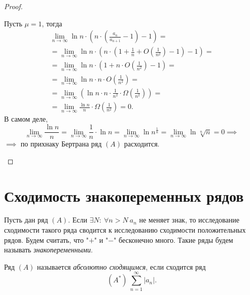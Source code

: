 \begin{proof}
\begin{enumerate}
              Пусть $\mu = 1$, тогда
              \begin{multline*}
                  \underset{n\rightarrow\infty}{\lim}\ln n \cdot \left(n \cdot \left(\frac{a_n}{a_{n+1}} - 1\right) - 1\right) = \\
                  = \underset{n\rightarrow\infty}{\lim}\ln n \cdot \left(n \cdot \left(1 + \frac{1}{n} + O\left(\frac{1}{n^2}\right) - 1\right) - 1\right) = \\
                  = \underset{n\rightarrow\infty}{\lim}\ln n \cdot \left(1 + n \cdot O\left(\frac{1}{n^2}\right) - 1\right) = \\
                  = \underset{n\rightarrow\infty}{\lim}\ln n \cdot n \cdot O\left(\frac{1}{n^2}\right) = \\
                  = \underset{n\rightarrow\infty}{\lim}\left(\ln n \cdot n \cdot \frac{1}{n^2} \cdot \Omega\left(\frac{1}{n^2}\right)\right) = \\
                  = \underset{n\rightarrow\infty}{\lim}\frac{\ln n}{n} \cdot \Omega\left(\frac{1}{n^2}\right) = 0.
              \end{multline*}
              В самом деле,
              \[
                  \underset{n\rightarrow\infty}{\lim}\frac{\ln n}{n} = \underset{n\rightarrow\infty}{\lim} \frac{1}{n} \cdot \ln n = \underset{n\rightarrow\infty}{\lim}\ln n^{\frac{1}{n}} = \underset{n\rightarrow\infty}{\lim} \ln \sqrt[n]{n} = 0 \implies
              \]
              $\implies$ по прихнаку Бертрана ряд $(A)$ расходится.
    \end{enumerate}
\end{proof}

\section{Сходимость знакопеременных рядов}

\begin{note}
    Пусть дан ряд $(A)$. Если $\exists N: \ \forall n > N \ a_n$ не меняет знак, то исследование сходимости такого ряда сводится к исследованию сходимости положительных рядов. Будем считать, что "$+$" и "$-$" бесконечно много. Такие ряды будем называть \emph{знакопеременными}.
\end{note}

\begin{definition}
    Ряд $(A)$ называется \emph{абсолютно сходящимся}, если сходится ряд
    \[
        (A^*) \ \sum_{n=1}^{\infty}|a_n|.
    \]
\end{definition}

